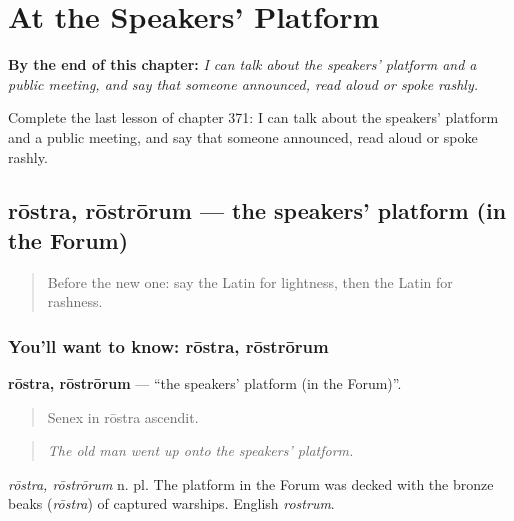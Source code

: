 
\chapter{At the Speakers' Platform}
\label{ch:la-at-the-speakers-platform}

\begin{chapteropening}
\textbf{By the end of this chapter:} \emph{I can talk about the speakers' platform and a public meeting, and say that someone announced, read aloud or spoke rashly.}

Complete the last lesson of chapter 371: I can talk about the speakers' platform and a public meeting, and say that someone announced, read aloud or spoke rashly.
\end{chapteropening}

\section[rōstra, rōstrōrum]{rōstra, rōstrōrum — the speakers' platform (in the Forum)}

\label{lesson:LA-C371-rostra}



\begin{quote}
Before the new one: say the Latin for lightness, then the Latin for rashness.
\end{quote}

\subsection*{You'll want to know: rōstra, rōstrōrum}
\textbf{rōstra, rōstrōrum} — \textquotedblleft{}the speakers' platform (in the Forum)\textquotedblright{}.

\begin{quote}
Senex in rōstra ascendit.
\end{quote}

\begin{quote}
\emph{The old man went up onto the speakers' platform.}
\end{quote}

\emph{rōstra, rōstrōrum} n. pl. The platform in the Forum was decked with the bronze beaks (\emph{rōstra}) of captured warships. English \emph{rostrum}.


